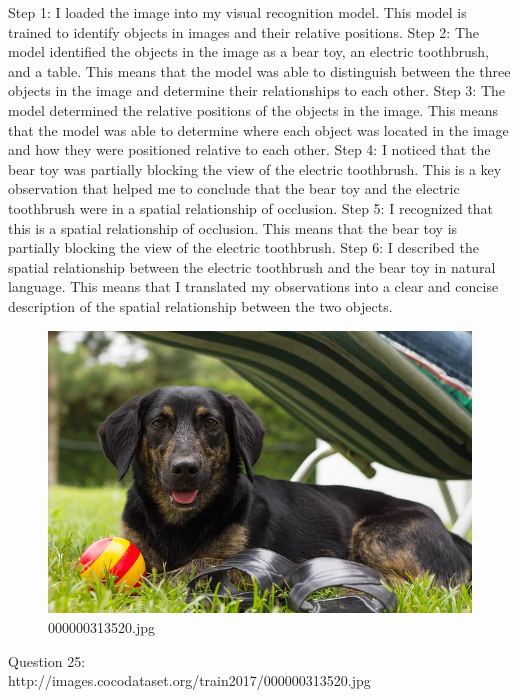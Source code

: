 \begin{enumerate}
        Step 1: I loaded the image into my visual recognition model. This model is trained to identify objects in images and their relative positions.
        Step 2: The model identified the objects in the image as a bear toy, an electric toothbrush, and a table. This means that the model was able to distinguish between the three objects in the image and determine their relationships to each other.
        Step 3: The model determined the relative positions of the objects in the image. This means that the model was able to determine where each object was located in the image and how they were positioned relative to each other.
        Step 4: I noticed that the bear toy was partially blocking the view of the electric toothbrush. This is a key observation that helped me to conclude that the bear toy and the electric toothbrush were in a spatial relationship of occlusion.
        Step 5: I recognized that this is a spatial relationship of occlusion. This means that the bear toy is partially blocking the view of the electric toothbrush.
        Step 6: I described the spatial relationship between the electric toothbrush and the bear toy in natural language. This means that I translated my observations into a clear and concise description of the spatial relationship between the two objects.
    \end{enumerate}
    \begin{figure}[h]
        \centering
        \includegraphics[width=0.8\linewidth]{../image set/easy/000000313520.jpg}
        \caption{000000313520.jpg}
    \end{figure}
    Question 25:\\http://images.cocodataset.org/train2017/000000313520.jpg
